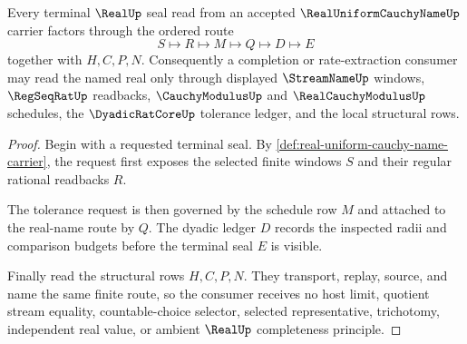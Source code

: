 \begin{theorem}
\label{thm:real-uniform-cauchy-name-seal-nonescape}
Every terminal $\RealUp$ seal read from an accepted $\RealUniformCauchyNameUp$ carrier factors through the ordered route
$$
S\longmapsto R\longmapsto M\longmapsto Q\longmapsto D\longmapsto E
$$
together with $H,C,P,N$. Consequently a completion or rate-extraction consumer may read the named real only through displayed $\StreamNameUp$ windows, $\RegSeqRatUp$ readbacks, $\CauchyModulusUp$ and $\RealCauchyModulusUp$ schedules, the $\DyadicRatCoreUp$ tolerance ledger, and the local structural rows.
\end{theorem}
\begin{proof}
Begin with a requested terminal seal. By \autoref{def:real-uniform-cauchy-name-carrier}, the request first exposes the selected finite windows $S$ and their regular rational readbacks $R$.

The tolerance request is then governed by the schedule row $M$ and attached to the real-name route by $Q$. The dyadic ledger $D$ records the inspected radii and comparison budgets before the terminal seal $E$ is visible.

Finally read the structural rows $H,C,P,N$. They transport, replay, source, and name the same finite route, so the consumer receives no host limit, quotient stream equality, countable-choice selector, selected representative, trichotomy, independent real value, or ambient $\RealUp$ completeness principle.
\end{proof}




